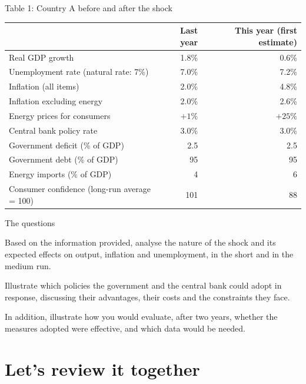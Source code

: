 \documentclass[aspectratio=169,xcolor=table]{beamer}
\begin{document}
\begin{frame}{Table 1: Country A before and after the shock}
\centering\footnotesize
\begin{tabular}{lrr}
\toprule
 & \textbf{Last year} & \textbf{This year (first estimate)}\\
\midrule
Real GDP growth & 1.8\% & 0.6\% \\
Unemployment rate (natural rate: 7\%) & 7.0\% & 7.2\% \\
Inflation (all items) & 2.0\% & 4.8\% \\
Inflation excluding energy & 2.0\% & 2.6\% \\
Energy prices for consumers & $+1\%$ & $+25\%$ \\
Central bank policy rate & 3.0\% & 3.0\% \\
Government deficit (\% of GDP) & 2.5 & 2.5 \\
Government debt (\% of GDP) & 95 & 95 \\
Energy imports (\% of GDP) & 4 & 6 \\
Consumer confidence (long-run average = 100) & 101 & 88 \\
\bottomrule
\end{tabular}
\end{frame}

\begin{frame}{The questions}
\small
\begin{block}{}
Based on the information provided, analyse the nature of the shock and its expected effects on output, inflation and unemployment, in the short and in the medium run.
\end{block}
\vspace{0.05cm}
\begin{block}{}
Illustrate which policies the government and the central bank could adopt in response, discussing their advantages, their costs and the constraints they face.
\end{block}
\vspace{0.05cm}
\begin{block}{}
In addition, illustrate how you would evaluate, after two years, whether the measures adopted were effective, and which data would be needed.
\end{block}
\end{frame}

\ifdefined\pelReview

\section{Let's review it together}
\end{document}
